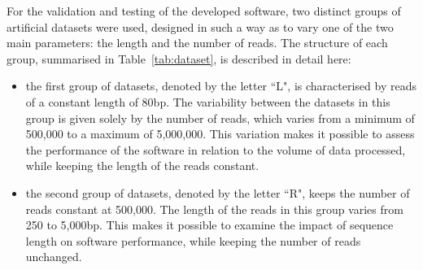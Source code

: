 	For the validation and testing of the developed software, two distinct groups of artificial datasets were used, designed in such a way as to vary one of the two main parameters: the length and the number of reads. The structure of each group, summarised in Table~\ref{tab:dataset}, is described in detail here:
	\begin{itemize}
		\item the first group of datasets, denoted by the letter “L", is characterised by reads of a constant length of 80bp. The variability between the datasets in this group is given solely by the number of reads, which varies from a minimum of 500,000 to a maximum of 5,000,000. This variation makes it possible to assess the performance of the software in relation to the volume of data processed, while keeping the length of the reads constant.
		
		\item the second group of datasets, denoted by the letter “R", keeps the number of reads constant at 500,000. The length of the reads in this group varies from 250 to 5,000bp. This makes it possible to examine the impact of sequence length on software performance, while keeping the number of reads unchanged.
	\end{itemize}
	
